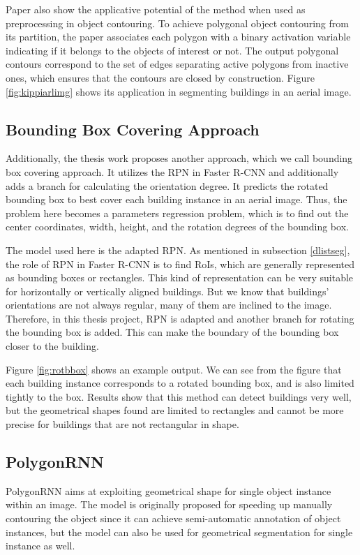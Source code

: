

Paper \cite{kippi} also show the applicative potential of the method when used as preprocessing in object contouring. To achieve polygonal object contouring from its partition, the paper associates each polygon with a binary activation variable indicating if it belongs to the objects of interest or not. The output polygonal contours correspond to the set of edges separating active polygons from inactive ones, which ensures that the contours are closed by construction. Figure \ref{fig:kippiarlimg} shows its application in segmenting buildings in an aerial image.

\subsection{Bounding Box Covering Approach}\label{bboxapp}
Additionally, the thesis work \cite{msnadine} proposes another approach, which we call bounding box covering approach. It utilizes the RPN in Faster R-CNN \cite{fasterrcnn} and additionally adds a branch for calculating the orientation degree. It predicts the rotated bounding box to best cover each building instance in an aerial image. Thus, the problem here becomes a parameters regression problem, which is to find out the center coordinates, width, height, and the rotation degrees of the bounding box. 

The model used here is the adapted RPN. As mentioned in subsection \ref{dlistseg}, the role of RPN in Faster R-CNN is to find RoIs, which are generally represented as bounding boxes or rectangles. This kind of representation can be very suitable for horizontally or vertically aligned buildings. But we know that buildings' orientations are not always regular, many of them are inclined to the image. Therefore, in this thesis project, RPN is adapted and another branch for rotating the bounding box is added. This can make the boundary of the bounding box closer to the building.



Figure \ref{fig:rotbbox} shows an example output. We can see from the figure that each building instance corresponds to a rotated bounding box, and is also limited tightly to the box. Results show that this method can detect buildings very well, but the geometrical shapes found are limited to rectangles and cannot be more precise for buildings that are not rectangular in shape.

\subsection{PolygonRNN}\label{polygonrnn}
PolygonRNN \cite{polygonrnn} aims at exploiting geometrical shape for single object instance within an image. The model is originally proposed for speeding up manually contouring the object since it can achieve semi-automatic annotation of object instances, but the model can also be used for geometrical segmentation for single instance as well.

